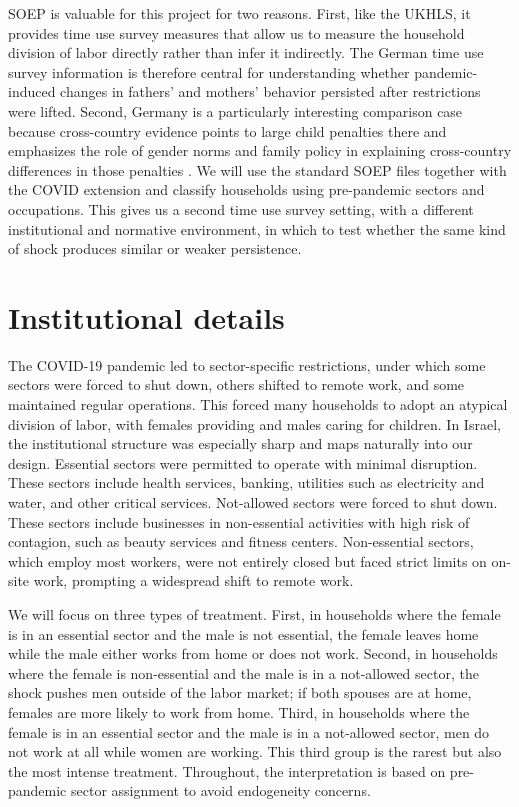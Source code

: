 \documentclass[12pt]{article}
\begin{document}
SOEP is valuable for this project for two reasons. First, like the UKHLS, it provides time use survey measures that allow us to measure the household division of labor directly rather than infer it indirectly. The German time use survey information is therefore central for understanding whether pandemic-induced changes in fathers' and mothers' behavior persisted after restrictions were lifted. Second, Germany is a particularly interesting comparison case because cross-country evidence points to large child penalties there and emphasizes the role of gender norms and family policy in explaining cross-country differences in those penalties \citep{kleven2019childpenalties}. We will use the standard SOEP files together with the COVID extension and classify households using pre-pandemic sectors and occupations. This gives us a second time use survey setting, with a different institutional and normative environment, in which to test whether the same kind of shock produces similar or weaker persistence.

\section{Institutional details}

The COVID-19 pandemic led to sector-specific restrictions, under which some sectors were forced to shut down, others shifted to remote work, and some maintained regular operations. This forced many households to adopt an atypical division of labor, with females providing and males caring for children. In Israel, the institutional structure was especially sharp and maps naturally into our design. Essential sectors were permitted to operate with minimal disruption. These sectors include health services, banking, utilities such as electricity and water, and other critical services. Not-allowed sectors were forced to shut down. These sectors include businesses in non-essential activities with high risk of contagion, such as beauty services and fitness centers. Non-essential sectors, which employ most workers, were not entirely closed but faced strict limits on on-site work, prompting a widespread shift to remote work.

We will focus on three types of treatment. First, in households where the female is in an essential sector and the male is not essential, the female leaves home while the male either works from home or does not work. Second, in households where the female is non-essential and the male is in a not-allowed sector, the shock pushes men outside of the labor market; if both spouses are at home, females are more likely to work from home. Third, in households where the female is in an essential sector and the male is in a not-allowed sector, men do not work at all while women are working. This third group is the rarest but also the most intense treatment. Throughout, the interpretation is based on pre-pandemic sector assignment to avoid endogeneity concerns.
\end{document}
